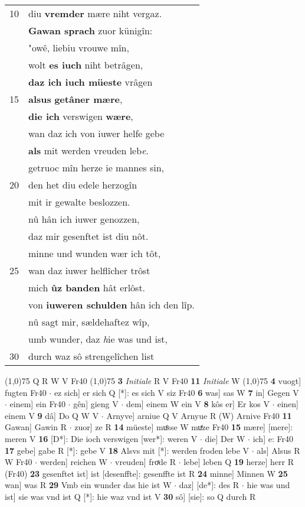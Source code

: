 \documentclass[8pt,a4paper,notitlepage]{article}
\begin{document}
\begin{table}[ht]
\begin{minipage}[t]{0.5\linewidth}
\begin{tabular}{rl}
10 & diu \textbf{vremder} mære niht vergaz.\\ 
 & \textbf{Gawan sprach} zuor künigîn:\\ 
 & "owê, liebiu vrouwe mîn,\\ 
 & wolt \textbf{es iuch} niht betrâgen,\\ 
 & \textbf{daz ich iuch müeste} vrâgen\\ 
15 & \textbf{alsus} \textbf{getâner mære},\\ 
 & \textbf{die ich} verswigen \textbf{wære},\\ 
 & wan daz ich von iuwer helfe gebe\\ 
 & \textbf{als} mit werden vreuden leb\textit{e}.\\ 
 & getruoc mîn herze ie mannes sin,\\ 
20 & den het diu edele herzogîn\\ 
 & mit ir gewalte beslozzen.\\ 
 & nû hân ich iuwer genozzen,\\ 
 & daz mir gesenftet ist diu nôt.\\ 
 & minne und wunden wær ich tôt,\\ 
25 & wan daz iuwer helflîcher trôst\\ 
 & mich \textbf{ûz banden} hât erlôst.\\ 
 & von \textbf{iuweren schulden} hân ich den lîp.\\ 
 & nû sagt mir, sældehaftez wîp,\\ 
 & umb wunder, daz \textit{h}ie was und ist,\\ 
30 & durch waz sô strengelîchen list\\ 
\end{tabular}
\scriptsize
\line(1,0){75} \newline
Q R W V Fr40 \newline
\line(1,0){75} \newline
\textbf{3} \textit{Initiale} R V Fr40  \textbf{11} \textit{Initiale} W  \newline
\line(1,0){75} \newline
\textbf{4} vuogt] fugten Fr40  $\cdot$ ez sich] er sich Q [*]: es sich V siz Fr40 \textbf{6} was] sas W \textbf{7} in] Gegen V  $\cdot$ einem] ein Fr40  $\cdot$ gên] gieng V  $\cdot$ dem] einem W ein V \textbf{8} kôs er] Er kos V  $\cdot$ einen] einem V \textbf{9} dâ] Do Q W V  $\cdot$ Arnyve] arniue Q V Arnyue R (W) Arnive Fr40 \textbf{11} Gawan] Gawin R  $\cdot$ zuor] ze R \textbf{14} müeste] muͦsse W muͤze Fr40 \textbf{15} mære] [mere]: meren V \textbf{16} [D*]: Die ioch verswigen [wer*]: weren V  $\cdot$ die] Der W  $\cdot$ ich] e: Fr40 \textbf{17} gebe] gabe R [*]: gebe V \textbf{18} Alsvs mit [*]: werden froden lebe V  $\cdot$ als] Alsus R W Fr40  $\cdot$ werden] reichen W  $\cdot$ vreuden] froͯde R  $\cdot$ lebe] leben Q \textbf{19} herze] herr R (Fr40) \textbf{23} gesenftet ist] ist [desenffte]: gesenffte ist R \textbf{24} minne] Minnen W \textbf{25} wan] was R \textbf{29} Vmb ein wunder das hie ist W  $\cdot$ daz] [de*]: des R  $\cdot$ hie was und ist] sie was vnd ist Q [*]: hie waz vnd ist V \textbf{30} sô] [sie]: so Q durch R \newline

\end{minipage}
\end{table}
\end{document}
